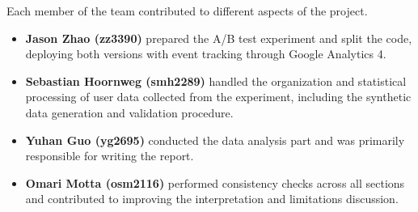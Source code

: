 \documentclass{article}
\begin{document}
Each member of the team contributed to different aspects of the project.

\begin{itemize}
    \item \textbf{Jason Zhao (zz3390)}  prepared the A/B test experiment and split the code, deploying both versions with event tracking through Google Analytics 4.

    \item \textbf{Sebastian Hoornweg (smh2289)} handled the organization and statistical processing of user data collected from the experiment, including the synthetic data generation and validation procedure.

    \item \textbf{Yuhan Guo (yg2695)} conducted the data analysis part and was primarily responsible for writing the report.

    \item \textbf{Omari Motta (osm2116)} performed consistency checks across all sections and contributed to improving the interpretation and limitations discussion.
\end{itemize}
\end{document}
